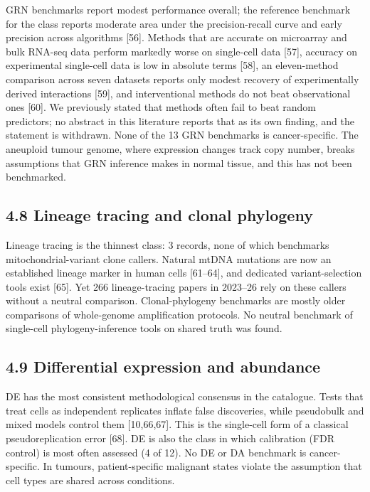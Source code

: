 \documentclass{article}
\begin{document}
GRN benchmarks report modest performance overall; the reference
benchmark for the class reports moderate area under the precision-recall
curve and early precision across algorithms {[}56{]}. Methods that are
accurate on microarray and bulk RNA-seq data perform markedly worse on
single-cell data {[}57{]}, accuracy on experimental single-cell data is
low in absolute terms {[}58{]}, an eleven-method comparison across seven
datasets reports only modest recovery of experimentally derived
interactions {[}59{]}, and interventional methods do not beat
observational ones {[}60{]}. We previously stated that methods often
fail to beat random predictors; no abstract in this literature reports
that as its own finding, and the statement is withdrawn. None of the 13
GRN benchmarks is cancer-specific. The aneuploid tumour genome, where
expression changes track copy number, breaks assumptions that GRN
inference makes in normal tissue, and this has not been benchmarked.

\subsection{4.8 Lineage tracing and clonal phylogeny}\label{lineage-tracing-and-clonal-phylogeny}

Lineage tracing is the thinnest class: 3 records, none of which
benchmarks mitochondrial-variant clone callers. Natural mtDNA mutations
are now an established lineage marker in human cells {[}61--64{]}, and
dedicated variant-selection tools exist {[}65{]}. Yet 266
lineage-tracing papers in 2023--26 rely on these callers without a
neutral comparison. Clonal-phylogeny benchmarks are mostly older
comparisons of whole-genome amplification protocols. No neutral
benchmark of single-cell phylogeny-inference tools on shared truth was
found.

\subsection{4.9 Differential expression and abundance}\label{differential-expression-and-abundance}

DE has the most consistent methodological consensus in the catalogue.
Tests that treat cells as independent replicates inflate false
discoveries, while pseudobulk and mixed models control them
{[}10,66,67{]}. This is the single-cell form of a classical
pseudoreplication error {[}68{]}. DE is also the class in which
calibration (FDR control) is most often assessed (4 of 12). No DE or DA
benchmark is cancer-specific. In tumours, patient-specific malignant
states violate the assumption that cell types are shared across
conditions.
\end{document}
